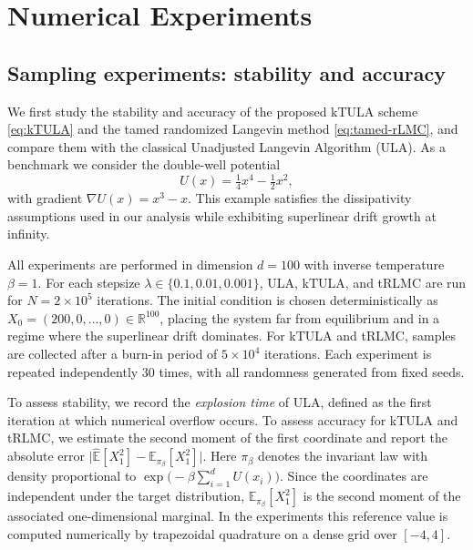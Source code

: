 \documentclass[11pt,a4paper,reqno]{amsart}
\theoremstyle{plain}
\theoremstyle{definition}
\theoremstyle{remark}
\newcommand{\R}{\mathbb{R}}
\newcommand{\E}{\mathbb{E}}
\begin{document}
\section{Numerical Experiments}
\label{sec:numerical-experiments}

\subsection{Sampling experiments: stability and accuracy}
\label{subsec:sampling-experiments}

We first study the stability and accuracy of the proposed kTULA scheme \eqref{eq:kTULA} and the tamed randomized Langevin method \eqref{eq:tamed-rLMC}, and compare them with the classical Unadjusted Langevin Algorithm (ULA). As a benchmark we consider the double-well potential
\begin{equation}
U(x)=\tfrac14 x^4-\tfrac12 x^2,
\end{equation}
with gradient \(\nabla U(x)=x^3-x\). This example satisfies the dissipativity assumptions used in our analysis while exhibiting superlinear drift growth at infinity.

All experiments are performed in dimension \(d=100\) with inverse temperature \(\beta=1\). For each stepsize \(\lambda\in\{0.1,0.01,0.001\}\), ULA, kTULA, and tRLMC are run for \(N=2\times 10^5\) iterations. The initial condition is chosen deterministically as \(X_0=(200,0,\dots,0)\in\R^{100}\),
placing the system far from equilibrium and in a regime where the superlinear drift dominates. For kTULA and tRLMC, samples are collected after a burn-in period of \(5\times 10^4\) iterations. Each experiment is repeated independently \(30\) times, with all randomness generated from fixed seeds.

To assess stability, we record the \emph{explosion time} of ULA, defined as the first iteration at which numerical overflow occurs. To assess accuracy for kTULA and tRLMC, we estimate the second moment of the first coordinate and report the absolute error \(\bigl|\widehat{\E}[X_1^2]-\E_{\pi_\beta}[X_1^2]\bigr|\).
Here \(\pi_\beta\) denotes the invariant law with density proportional to \(\exp\!\bigl(-\beta\sum_{i=1}^d U(x_i)\bigr)\).
Since the coordinates are independent under the target distribution, \(\E_{\pi_\beta}[X_1^2]\) is the second moment of the associated one-dimensional marginal. In the experiments this reference value is computed numerically by trapezoidal quadrature on a dense grid over \([-4,4]\).
\end{document}
